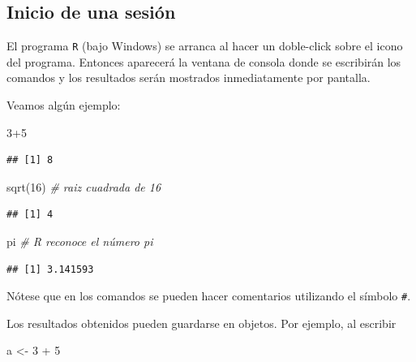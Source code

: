 \documentclass[
]{book}
\newenvironment{Shaded}{\begin{snugshade}}{\end{snugshade}}
\newcommand{\CommentTok}[1]{\textcolor[rgb]{0.56,0.35,0.01}{\textit{#1}}}
\newcommand{\DecValTok}[1]{\textcolor[rgb]{0.00,0.00,0.81}{#1}}
\newcommand{\FunctionTok}[1]{\textcolor[rgb]{0.00,0.00,0.00}{#1}}
\newcommand{\NormalTok}[1]{#1}
\newcommand{\OtherTok}[1]{\textcolor[rgb]{0.56,0.35,0.01}{#1}}
\newcommand{\SpecialCharTok}[1]{\textcolor[rgb]{0.00,0.00,0.00}{#1}}
\theoremstyle{break}
\begin{document}
\hypertarget{inicio-de-una-sesiuxf3n}{%
\subsection{Inicio de una sesión}\label{inicio-de-una-sesiuxf3n}}

El programa \texttt{R} (bajo
Windows) se arranca al hacer un doble-click sobre el icono del programa.
Entonces aparecerá la ventana de consola donde se escribirán los
comandos y los resultados serán mostrados inmediatamente por pantalla.

Veamos algún ejemplo:

\begin{Shaded}
\begin{Highlighting}[]
\DecValTok{3}\SpecialCharTok{+}\DecValTok{5}
\end{Highlighting}
\end{Shaded}

\begin{verbatim}
## [1] 8
\end{verbatim}

\begin{Shaded}
\begin{Highlighting}[]
\FunctionTok{sqrt}\NormalTok{(}\DecValTok{16}\NormalTok{) }\CommentTok{\# raiz cuadrada de 16}
\end{Highlighting}
\end{Shaded}

\begin{verbatim}
## [1] 4
\end{verbatim}

\begin{Shaded}
\begin{Highlighting}[]
\NormalTok{pi }\CommentTok{\# R reconoce el número pi}
\end{Highlighting}
\end{Shaded}

\begin{verbatim}
## [1] 3.141593
\end{verbatim}

Nótese que en los comandos se pueden hacer comentarios utilizando el
símbolo \texttt{\#}.

Los resultados obtenidos pueden guardarse en objetos. Por
ejemplo, al escribir

\begin{Shaded}
\begin{Highlighting}[]
\NormalTok{a }\OtherTok{\textless{}{-}} \DecValTok{3} \SpecialCharTok{+} \DecValTok{5}
\end{Highlighting}
\end{Shaded}
\end{document}
